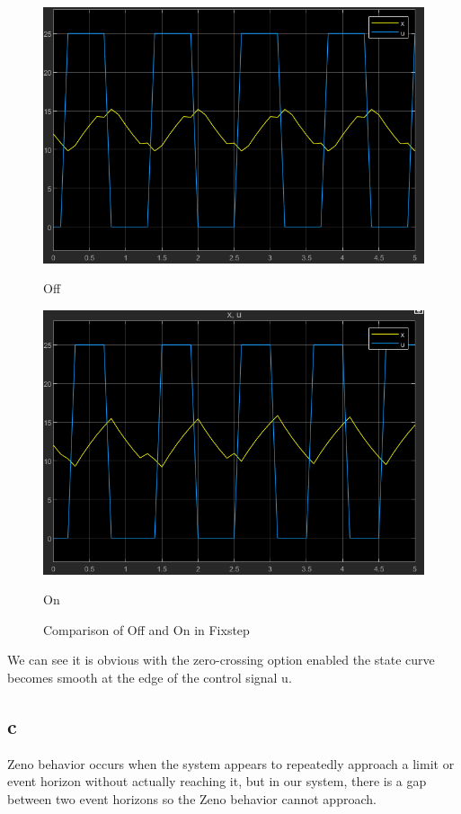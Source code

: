\begin{figure}[h]
    \centering
    \begin{minipage}{.5\textwidth}
      \centering
      \includegraphics[width=0.8\linewidth]{images/disableall.png}
      \caption{Off}
      \label{disableall}
    \end{minipage}%
    \begin{minipage}{.5\textwidth}
      \centering
      \includegraphics[width=0.8\linewidth]{images/enabledall.png}
      \caption{On}
      \label{enabledall}
    \end{minipage}
    \caption{Comparison of Off and On in Fixstep}
    \label{offandon}
    \end{figure}

    We can see it is obvious with the zero-crossing option enabled the state curve becomes smooth at the edge of the control signal u.

\subsection{c}

Zeno behavior occurs when the system appears to repeatedly approach a limit or event horizon without actually reaching it, but in our system, there is a gap between two event horizons so the Zeno behavior cannot approach.